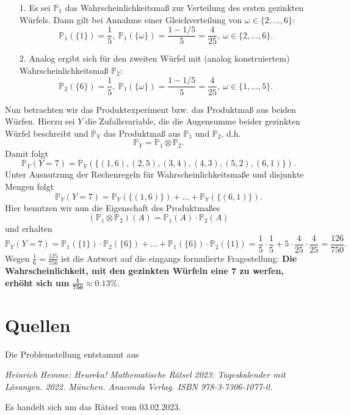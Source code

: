 \documentclass[]{scrartcl}
\begin{document}
\begin{itemize}
	\item[1.]
	{
	Es sei $\mathbb{P}_1$ das Wahrscheinlichkeitsmaß zur Verteilung des ersten gezinkten Würfels.
	Dann gilt bei Annahme einer Gleichverteilung von $\omega \in \{2,\ldots,6\}$:
	$$
	\mathbb{P}_1(\{1\}) = \frac{1}{5}, ~ \mathbb{P}_1(\{\omega\}) = \frac{1-1/5}{5} = \frac{4}{25},
	~ \omega \in \{2,\ldots,6\}.
	$$
	}
	\item[2.]
	{
	Analog ergibt sich für den zweiten Würfel mit (analog konstruiertem) Wahrscheinlichkeitsmaß
	$\mathbb{P}_2$:
	$$
	\mathbb{P}_2(\{6\}) = \frac{1}{5}, ~ \mathbb{P}_1(\{\omega\}) = \frac{1-1/5}{5} = \frac{4}{25},
	~ \omega \in \{1,\ldots,5\}.
	$$
	}
\end{itemize}
Nun betrachten wir das Produktexperiment bzw. das Produktmaß aus beiden Würfen. Hierzu sei $Y$ 
die Zufallsvariable, die die Augensumme beider gezinkten Würfel beschreibt und $\mathbb{P}_Y$ das
Produktmaß aus $\mathbb{P}_1$ und $\mathbb{P}_2$, d.h.
$$
\mathbb{P}_Y = \mathbb{P}_1 \otimes \mathbb{P}_2.
$$
Damit folgt
$$
\mathbb{P}_Y(Y=7) =
\mathbb{P}_Y(\{(1,6),(2,5),(3,4),(4,3),(5,2),(6,1)\}).
$$
Unter Ausnutzung der Rechenregeln für Wahrscheinlichkeitsmaße und disjunkte Mengen folgt
$$
\mathbb{P}_Y(Y=7) =
\mathbb{P}_Y(\{(1,6)\}) + \ldots + \mathbb{P}_Y(\{(6,1)\}).
$$
Hier benutzen wir nun die Eigenschaft des Produktmaßes 
$$
(\mathbb{P}_1 \otimes \mathbb{P}_2)(A) = \mathbb{P}_1(A) \cdot \mathbb{P}_2(A)
$$
und erhalten
$$
\mathbb{P}_Y(Y=7) =
\mathbb{P}_1(\{1\}) \cdot \mathbb{P}_2(\{6\}) + \ldots + \mathbb{P}_1(\{6\}) \cdot
\mathbb{P}_2(\{1\}) = \frac{1}{5} \cdot \frac{1}{5} + 5 \cdot \frac{4}{25} \cdot \frac{4}{25}
= \frac{126}{750}.
$$
Wegen $\frac{1}{6} = \frac{125}{750}$ ist die Antwort auf die eingangs formulierte Fragestellung:
\newline 
\textbf{Die Wahrscheinlichkeit, mit den gezinkten Würfeln eine 7 zu werfen, erhöht sich um} 
$\pmb{\frac{1}{750} \approx 0.13\%}$.

\section*{Quellen}
Die Problemstellung entstammt aus

\centering
	\textit{Heinrich Hemme: Heureka! Mathematische Rätsel 2023: Tageskalender mit Lösungen.
	2022. München. Anaconda Verlag. ISBN 978-3-7306-1077-0.}

\raggedright
Es handelt sich um das Rätsel vom 03.02.2023.
\end{document}
